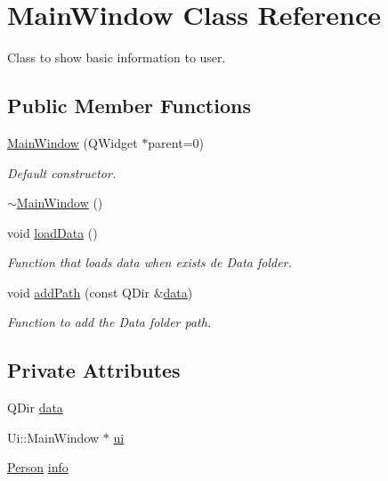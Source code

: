 \hypertarget{class_main_window}{\section{Main\+Window Class Reference}
\label{class_main_window}
}


Class to show basic information to user.  


\subsection*{Public Member Functions}
\begin{DoxyCompactItemize}
\item 
\hyperlink{class_main_window_a8b244be8b7b7db1b08de2a2acb9409db}{Main\+Window} (Q\+Widget $\ast$parent=0)
\begin{DoxyCompactList}\small\item\em Default constructor. \end{DoxyCompactList}\item 
\hyperlink{class_main_window_ae98d00a93bc118200eeef9f9bba1dba7}{$\sim$\+Main\+Window} ()
\item 
void \hyperlink{class_main_window_a6906cd747941813c6da899b18d881473}{load\+Data} ()
\begin{DoxyCompactList}\small\item\em Function that loads data when exists de {\itshape Data} folder. \end{DoxyCompactList}\item 
void \hyperlink{class_main_window_a44d044deed1ddca8952f59554705e28d}{add\+Path} (const Q\+Dir \&\hyperlink{class_main_window_a1dc35bda22acc11636be809539ab73d9}{data})
\begin{DoxyCompactList}\small\item\em Function to add the {\itshape Data} folder path. \end{DoxyCompactList}\end{DoxyCompactItemize}
\subsection*{Private Attributes}
\begin{DoxyCompactItemize}
\item 
Q\+Dir \hyperlink{class_main_window_a1dc35bda22acc11636be809539ab73d9}{data}
\item 
Ui\+::\+Main\+Window $\ast$ \hyperlink{class_main_window_a35466a70ed47252a0191168126a352a5}{ui}
\item 
\hyperlink{class_person}{Person} \hyperlink{class_main_window_a2d1f101eed410e692b5db9b7226174bf}{info}
\end{DoxyCompactItemize}


